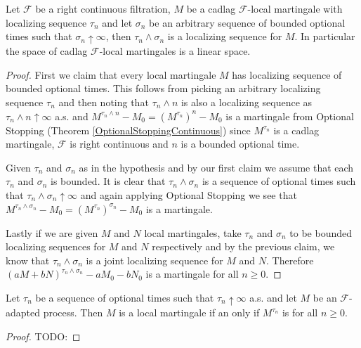 \begin{lem}Let $\mathcal{F}$ be a right continuous filtration, $M$ be a cadlag $\mathcal{F}$-local martingale with localizing sequence $\tau_n$ and let $\sigma_n$ be an arbitrary sequence of bounded optional times such that $\sigma_n \uparrow \infty$, then $\tau_n \wedge \sigma_n$ is a localizing sequence for $M$.  In particular the space of cadlag $\mathcal{F}$-local martingales is a linear space.
\end{lem}
\begin{proof}
First we claim that every local martingale $M$ has localizing sequence of bounded optional times.  This follows from picking an arbitrary localizing sequence $\tau_n$ and then noting that $\tau_n \wedge n$ is also a localizing sequence as $\tau_n \wedge n \uparrow \infty$ a.s. and $M^{\tau_n \wedge n} -M_0 = (M^{\tau_n})^n - M_0$ is a martingale from Optional Stopping (Theorem \ref{OptionalStoppingContinuous}) since $M^{\tau_n}$ is a cadlag martingale, $\mathcal{F}$ is right continuous and $n$ is a bounded optional time.

Given $\tau_n$ and $\sigma_n$ as in the hypothesis and by our first claim we assume that each $\tau_n$ and $\sigma_n$ is bounded.  It is clear that $\tau_n \wedge \sigma_n$ is a sequence of optional times such that $\tau_n \wedge \sigma_n \uparrow \infty$ and again applying Optional Stopping we see that $M^{\tau_n \wedge \sigma_n} -M_0 = (M^{\tau_n})^{\sigma_n} - M_0$ is a martingale.  

Lastly if we are given $M$ and $N$ local martingales, take $\tau_n$ and $\sigma_n$ to be bounded localizing sequences for $M$ and $N$ respectively and by the previous claim, we know that $\tau_n \wedge \sigma_n$ is a joint localizing sequence for $M$ and $N$.   Therefore $(aM + bN)^{\tau_n \wedge \sigma_n} - a M_0 - b N_0$ is a martingale for all $n \geq 0$.
\end{proof}

\begin{lem}\label{LocalMartingaleLocalProperty}Let $\tau_n$ be a sequence of optional times such that $\tau_n \uparrow \infty$ a.s.  and let $M$ be an $\mathcal{F}$-adapted process.  Then $M$ is a local martingale if an only if $M^{\tau_n}$ is for all $n\geq 0$.
\end{lem}
\begin{proof}
TODO:
\end{proof}

